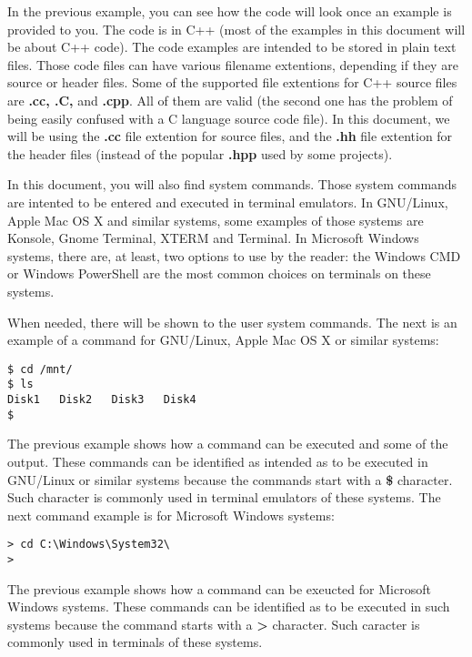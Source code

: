 \documentclass[11pt,twoside,openany,x11names,svgnames]{memoir}
\begin{document}
In the previous example, you can see how the code will look once an example is provided to you. The code is in C++ (most of the examples in this document will be about C++ code). The code examples are intended to be stored in plain text files. Those code files can have various filename extentions, depending if they are source or header files. Some of the supported file extentions for C++ source files are \textbf{.cc, .C,} and \textbf{.cpp}. All of them are valid (the second one has the problem of being easily confused with a C language source code file). In this document, we will be using the \textbf{.cc} file extention for source files, and the \textbf{.hh} file extention for the header files (instead of the popular \textbf{.hpp} used by some projects). 

In this document, you will also find system commands. Those system commands are intented to be entered and executed in terminal emulators. In GNU/Linux, Apple Mac OS X and similar systems, some examples of those systems are Konsole, Gnome Terminal, XTERM and Terminal. In Microsoft Windows systems, there are, at least, two options to use by the reader: the Windows CMD or Windows PowerShell are the most common choices on terminals on these systems.

When needed, there will be shown to the user system commands. The next is an example of a command for GNU/Linux, Apple Mac OS X or similar systems:

\begin{lstlisting}[frame=single,style=SystemCommandStyle]
$ cd /mnt/
$ ls
Disk1   Disk2   Disk3   Disk4
$
\end{lstlisting}

The previous example shows how a command can be executed and some of the output. These commands can be identified as intended as to be executed in GNU/Linux or similar systems because the commands start with a \textbf{\$} character. Such character is commonly used in terminal emulators of these systems. The next command example is for Microsoft Windows systems:

\begin{lstlisting}[frame=single,style=SystemCommandStyle]
> cd C:\Windows\System32\
> 
\end{lstlisting}

The previous example shows how a command can be exeucted for Microsoft Windows systems. These commands can be identified as to be executed in such systems because the command starts with a \textbf{\textgreater} character. Such caracter is commonly used in terminals of these systems.
\end{document}

